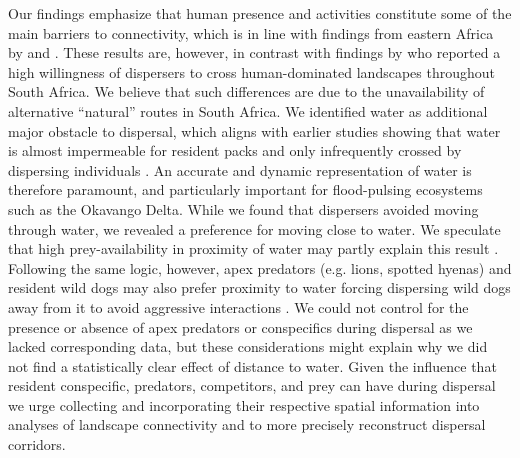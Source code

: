 \documentclass[abstract=on,10pt,a4paper,bibliography=totocnumbered]{article}
\begin{document}
Our findings emphasize that human presence and activities constitute some of the
main barriers to connectivity, which is in line with findings from eastern
Africa by \cite{Masenga.2016} and \cite{Oneill.2020}. These results are,
however, in contrast with findings by \citep{DaviesMostert.2012} who reported a
high willingness of dispersers to cross human-dominated landscapes throughout
South Africa. We believe that such differences are due to the unavailability of
alternative  ``natural''  routes in South Africa. We identified water as
additional major obstacle to dispersal, which aligns with earlier studies
showing that water is almost impermeable for resident packs and only
infrequently crossed by dispersing individuals \citep{Abrahms.2017, Cozzi.2020}.
An accurate and dynamic representation of water is therefore paramount, and
particularly important for flood-pulsing ecosystems such as the Okavango Delta.
While we found that dispersers avoided moving through water, we revealed a
preference for moving close to water. We speculate that high prey-availability
in proximity of water may partly explain this result \citep{Western.1975,
Bonyongo.2005}. Following the same logic, however, apex predators (e.g. lions,
spotted hyenas) and resident wild dogs may also prefer proximity to water
\citep{Valeix.2009} forcing dispersing wild dogs away from it
\citep{Ndaimani.2016} to avoid aggressive interactions \citep{Creel.1996,
Mills.1997}. We could not control for the presence or absence of apex predators
or conspecifics during dispersal as we lacked corresponding data, but these
considerations might explain why we did not find a statistically clear effect of
distance to water. Given the influence that resident conspecific, predators,
competitors, and prey can have during dispersal \citep{Cozzi.2018,
Armansin.2019} we urge collecting and incorporating their respective spatial
information into analyses of landscape connectivity and to more precisely
reconstruct dispersal corridors.
\end{document}
